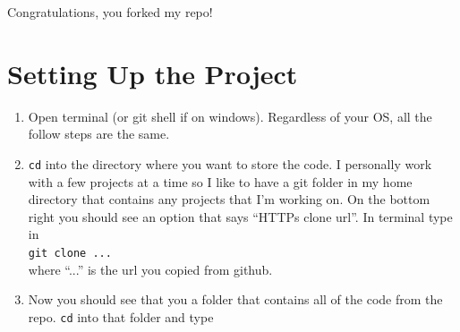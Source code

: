 \documentclass[11pt,fleqn]{article}
\theoremstyle{definition}
\begin{document}
Congratulations, you forked my repo!

\section*{Setting Up the Project}
\begin{enumerate}
\item
Open terminal (or git shell if on windows). Regardless of your OS, all the follow steps are the
same. 

\item
\texttt{cd} into the directory where you want to store the code. I personally work with a few
projects at a time so I like to have a git folder in my home directory that contains any projects
that I'm working on. On the bottom right you should see an option that says ``HTTPs clone url''. In
terminal type in \\
\texttt{git clone ...}\\
where ``...'' is the url you copied from github.  

\item
Now you should see that you a folder that contains all of the code from the repo. \texttt{cd} into
that folder and type 

\end{enumerate}
\end{document}
